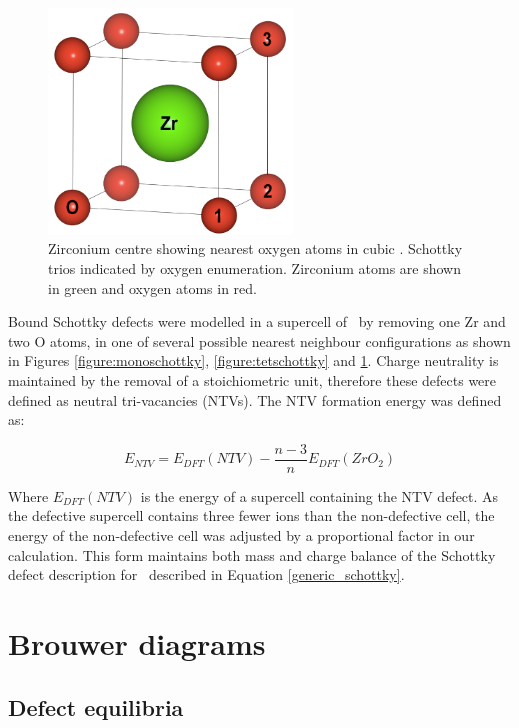\begin{figure}[htp] %
\centering
\includegraphics[height=6cm]{images/sd_cubic_zro2.png}
\caption{Zirconium centre showing nearest oxygen atoms in cubic \zirconia. Schottky trios indicated by oxygen enumeration. Zirconium atoms are shown in green and oxygen atoms in red.}
\label{figure:cubicschottky}
\end{figure}

Bound Schottky defects were modelled in a supercell of \zirconia\ by removing one Zr and two O atoms, in one of several possible nearest neighbour configurations as shown in Figures \ref{figure:monoschottky}, \ref{figure:tetschottky} and \ref{figure:cubicschottky}. Charge neutrality is maintained by the removal of a stoichiometric unit, therefore these defects were defined as neutral tri-vacancies (NTVs). The NTV formation energy was defined as:

\begin{equation}
\label{equation_NTV}
E_{NTV} = E_{DFT}(NTV) - \frac{n-3}{n}E_{DFT}(ZrO_2)%
\end{equation}

Where $E_{DFT}(NTV)$ is the energy of a supercell containing the NTV defect. As the defective supercell contains three fewer ions than the non-defective cell, the energy of the non-defective cell was adjusted by a proportional factor in our calculation. This form maintains both mass and charge balance of the Schottky defect description for \zirconia\ described in Equation \ref{generic_schottky}.

\section{Brouwer diagrams}

\subsection{Defect equilibria}

